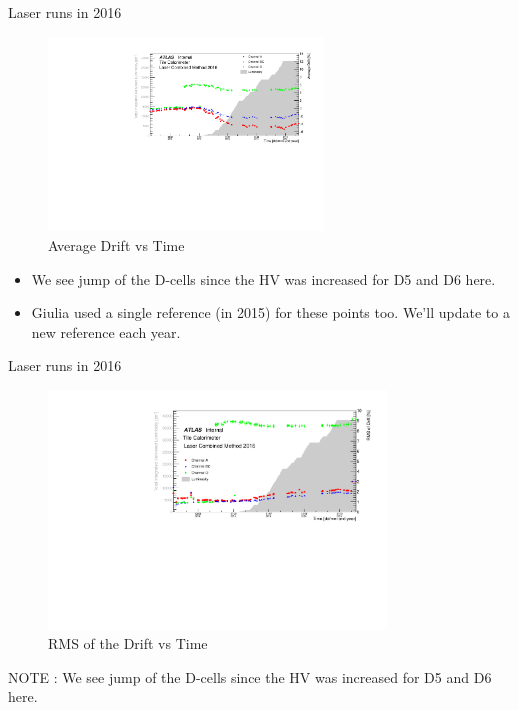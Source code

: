 \documentclass{beamer}
\begin{document}
\begin{frame}{Laser runs in 2016}{}
\begin{figure}
\centering
\includegraphics[width=0.65\textwidth]{drm16.pdf}
\caption{Average Drift vs Time}
\end{figure}
\begin{itemize}
    \item We see jump of the D-cells since the HV was increased for D5 and D6 here.
    \item Giulia used a single reference (in 2015) for these points too. We'll update to a new reference each year.
\end{itemize}
\end{frame}
 

\begin{frame}{Laser runs in 2016}{}
\begin{figure}
\centering
\includegraphics[width=0.8\textwidth]{drr16.pdf}
\caption{RMS of the Drift vs Time}
\end{figure}
NOTE : We see jump of the D-cells since the HV was increased for D5 and D6 here.

\end{frame}
\end{document}
